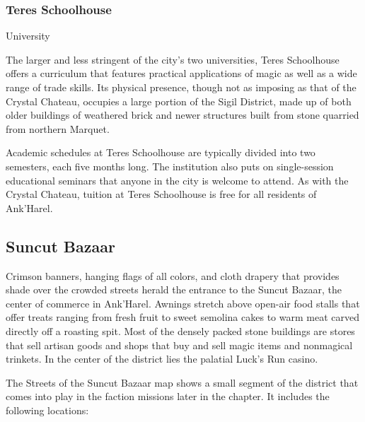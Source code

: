 \documentclass[10pt,a4paper,twoside,bg=print,twocolumn,openany,nodeprecatedcode]{dndbook}
\begin{document}
\subsubsection{Teres Schoolhouse}
University

The larger and less stringent of the city's two universities, Teres Schoolhouse offers a curriculum that features practical applications of magic as well as a wide range of trade skills. Its physical presence, though not as imposing as that of the Crystal Chateau, occupies a large portion of the Sigil District, made up of both older buildings of weathered brick and newer structures built from stone quarried from northern Marquet.

Academic schedules at Teres Schoolhouse are typically divided into two semesters, each five months long. The institution also puts on single-session educational seminars that anyone in the city is welcome to attend. As with the Crystal Chateau, tuition at Teres Schoolhouse is free for all residents of Ank'Harel.



\subsection{Suncut Bazaar}
Crimson banners, hanging flags of all colors, and cloth drapery that provides shade over the crowded streets herald the entrance to the Suncut Bazaar, the center of commerce in Ank'Harel. Awnings stretch above open-air food stalls that offer treats ranging from fresh fruit to sweet semolina cakes to warm meat carved directly off a roasting spit. Most of the densely packed stone buildings are stores that sell artisan goods and shops that buy and sell magic items and nonmagical trinkets. In the center of the district lies the palatial Luck's Run casino.

The Streets of the Suncut Bazaar map shows a small segment of the district that comes into play in the faction missions later in the chapter. It includes the following locations:
\end{document}

